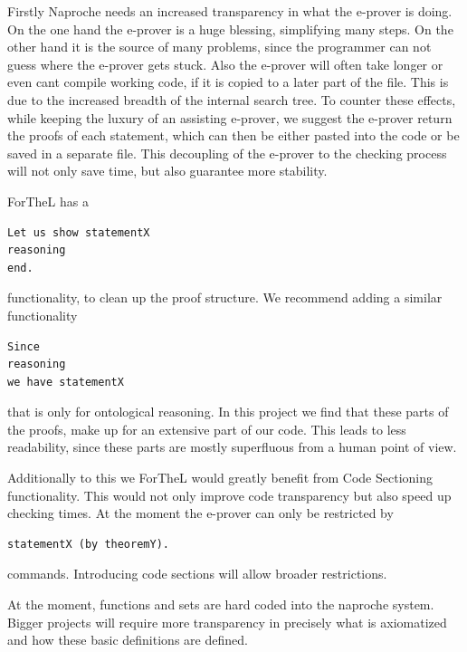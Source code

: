 \documentclass[11pt]{article}
\begin{document}
Firstly Naproche needs an increased transparency in what the e-prover is doing. On the one hand the e-prover is a huge blessing, simplifying many steps. On the other hand it is the source of many problems, since the programmer can not guess where the e-prover gets stuck. Also the e-prover will often take longer or even cant compile working code, if it is copied to a later part of the file. This is due to the increased breadth of the internal search tree. To counter these effects, while keeping the luxury of an assisting e-prover, we suggest the e-prover return the proofs of each statement, which can then be either pasted into the code or be saved in a separate file. This decoupling of the e-prover to the checking process will not only save time, but also guarantee more stability.

ForTheL has a 
\begin{lstlisting}
Let us show statementX
reasoning
end.
\end{lstlisting} 
functionality, to clean up the proof structure. We recommend adding a similar functionality
\begin{lstlisting}
Since 
reasoning
we have statementX
\end{lstlisting} 
that is only for ontological reasoning. In this project we find that these parts of the proofs, make up for an 
extensive part of our code. This leads to less readability, since these parts are mostly superfluous from
a human point of view.

Additionally to this we ForTheL would greatly benefit from Code Sectioning functionality. This would not only improve code transparency but also speed up checking times. At the moment the e-prover can only be restricted by 
\begin{lstlisting}
statementX (by theoremY).
\end{lstlisting}  commands. Introducing code sections will allow broader restrictions.

At the moment, functions and sets are hard coded into the naproche system. Bigger projects will require more transparency in precisely what is axiomatized and how these basic definitions are defined.
\end{document}
